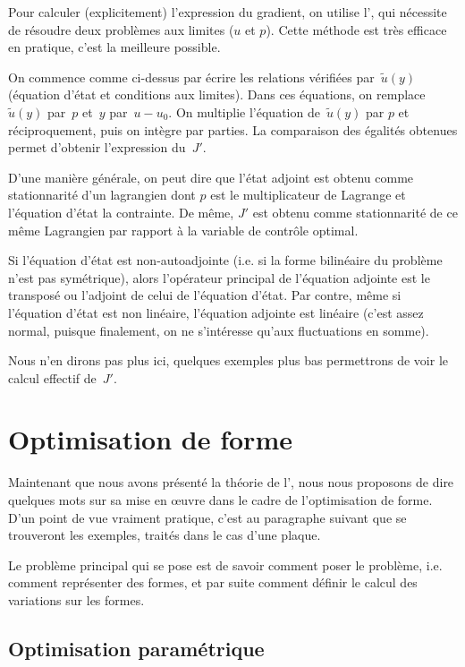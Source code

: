 \medskip
Pour calculer (explicitement) l'expression du gradient, on utilise l', qui nécessite de résoudre deux problèmes aux limites ($u$ et $p$).
Cette méthode est très efficace en pratique, c'est la meilleure possible.

On commence comme ci-dessus par écrire les relations vérifiées par~$\tilde{u}(y)$ (équation d'état et conditions aux limites). Dans ces équations, on remplace~$\tilde{u}(y)$ par~$p$ et~$y$ par~$u-u_0$. On multiplie l'équation de~$\tilde{u}(y)$ par $p$ et réciproquement, puis on intègre par parties. La comparaison des égalités obtenues permet d'obtenir l'expression du~$J'$.

D'une manière générale, on peut dire que l'état adjoint est obtenu comme stationnarité d'un lagrangien dont $p$ est le multiplicateur de Lagrange et l'équation d'état la contrainte.
De même, $J'$ est obtenu comme stationnarité de ce même Lagrangien par rapport à la variable de contrôle optimal.

Si l'équation d'état est non-autoadjointe (i.e. si la forme bilinéaire du problème n'est pas symétrique), alors l'opérateur principal de l'équation adjointe est le transposé ou l'adjoint de celui de l'équation d'état.
Par contre, même si l'équation d'état est non linéaire, l'équation adjointe est linéaire (c'est assez normal, puisque finalement, on ne s'intéresse qu'aux fluctuations en somme).

Nous n'en dirons pas plus ici, quelques exemples plus bas permettrons de voir le calcul effectif de~$J'$.


\medskip
\section{Optimisation de forme}

Maintenant que nous avons présenté la théorie de l', nous nous proposons de dire quelques mots sur sa mise en œuvre dans le cadre de l'optimisation de forme. D'un point de vue vraiment pratique, c'est au paragraphe suivant que se trouveront les exemples, traités dans le cas d'une plaque.

\medskip
Le problème principal qui se pose est de savoir comment poser le problème, i.e. comment représenter des formes, et par suite comment définir le calcul des variations sur les formes.

\medskip
\subsection{Optimisation paramétrique}

